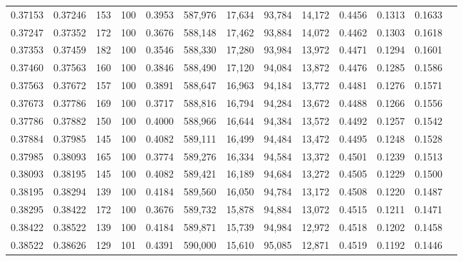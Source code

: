 \begin{tabular}{rrrrrrrrrrrrr}
0.37153 & 0.37246 &   153 & 100 &                                     0.3953 & 587,976 &  17,634 &  93,784 &  14,172 & 0.4456 & 0.1313 & 0.1633 \\
0.37247 & 0.37352 &   172 & 100 &                                     0.3676 & 588,148 &  17,462 &  93,884 &  14,072 & 0.4462 & 0.1303 & 0.1618 \\
0.37353 & 0.37459 &   182 & 100 &                                     0.3546 & 588,330 &  17,280 &  93,984 &  13,972 & 0.4471 & 0.1294 & 0.1601 \\
0.37460 & 0.37563 &   160 & 100 &                                     0.3846 & 588,490 &  17,120 &  94,084 &  13,872 & 0.4476 & 0.1285 & 0.1586 \\
0.37563 & 0.37672 &   157 & 100 &                                     0.3891 & 588,647 &  16,963 &  94,184 &  13,772 & 0.4481 & 0.1276 & 0.1571 \\
0.37673 & 0.37786 &   169 & 100 &                                     0.3717 & 588,816 &  16,794 &  94,284 &  13,672 & 0.4488 & 0.1266 & 0.1556 \\
0.37786 & 0.37882 &   150 & 100 &                                     0.4000 & 588,966 &  16,644 &  94,384 &  13,572 & 0.4492 & 0.1257 & 0.1542 \\
0.37884 & 0.37985 &   145 & 100 &                                     0.4082 & 589,111 &  16,499 &  94,484 &  13,472 & 0.4495 & 0.1248 & 0.1528 \\
0.37985 & 0.38093 &   165 & 100 &                                     0.3774 & 589,276 &  16,334 &  94,584 &  13,372 & 0.4501 & 0.1239 & 0.1513 \\
0.38093 & 0.38195 &   145 & 100 &                                     0.4082 & 589,421 &  16,189 &  94,684 &  13,272 & 0.4505 & 0.1229 & 0.1500 \\
0.38195 & 0.38294 &   139 & 100 &                                     0.4184 & 589,560 &  16,050 &  94,784 &  13,172 & 0.4508 & 0.1220 & 0.1487 \\
0.38295 & 0.38422 &   172 & 100 &                                     0.3676 & 589,732 &  15,878 &  94,884 &  13,072 & 0.4515 & 0.1211 & 0.1471 \\
0.38422 & 0.38522 &   139 & 100 &                                     0.4184 & 589,871 &  15,739 &  94,984 &  12,972 & 0.4518 & 0.1202 & 0.1458 \\
0.38522 & 0.38626 &   129 & 101 &                                     0.4391 & 590,000 &  15,610 &  95,085 &  12,871 & 0.4519 & 0.1192 & 0.1446 \\

\end{tabular}

